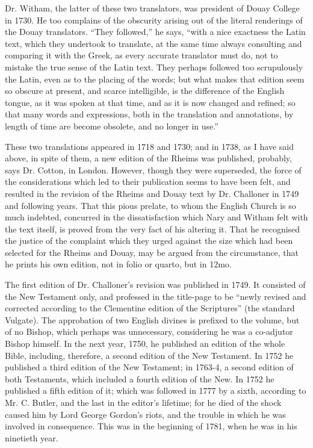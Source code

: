 Dr. Witham, the latter of these two translators, was president of
Douay College in 1730. He too complains of the obscurity arising out
of the literal renderings of the Douay translators. ``They
followed,'' he says, ``with a nice exactness the Latin text,
which they undertook to translate, at the same time always consulting
and comparing it with the Greek, as every accurate translator
must do, not to mistake the true sense of the Latin text. They perhaps
followed too scrupulously the Latin, even as to the placing of the
words; but what makes that edition seem so obscure at present, and
scarce intelligible, is the difference of the English tongue, as it
was spoken at that time, and as it is now changed and refined; so that
many words and expressions, both in the translation and annotations,
by length of time are become obsolete, and no longer in use.''

These two translations appeared in 1718 and 1730; and in 1738, as I
have said above, in spite of them, a new edition of the Rheims was
published, probably, says Dr. Cotton, in London. However, though they
were superseded, the force of the considerations which led to their
publication seems to have been felt, and resulted in the revision of
the Rheims and Douay text by Dr. Challoner in 1749 and following
years. That this pious prelate, to whom the English Church is so much
indebted, concurred in the dissatisfaction which Nary and Witham felt
with the text itself, is proved from the very fact of his altering it.
That he recognised the justice of the complaint which they urged
against the size which had been selected for the Rheims and Douay, may
be argued from the circumstance, that he prints his own edition, not
in folio or quarto, but in 12mo.

The first edition of Dr. Challoner's revision was published in
1749. It consisted of the New Testament only, and professed in the
title-page to be ``newly revised and corrected according to the
Clementine edition of the Scriptures'' (the standard
Vulgate). The approbation of two English divines is prefixed to the
volume, but of no Bishop, which perhaps was unnecessary, considering
he was a co-adjutor Bishop himself. In the next year, 1750, he
published an edition of the whole Bible, including, therefore, a
second edition of the New Testament. In 1752 he published a third
edition of the New Testament; in 1763-4, a second edition of both
Testaments, which included a fourth edition of the New. In 1752 he
published a fifth edition of it; which was followed in 1777 by a
sixth, according to Mr. C. Butler, and the last in the editor's
lifetime; for he died of the shock caused him by Lord George Gordon's
riots, and the trouble in which he was involved in consequence. This
was in the beginning of 1781, when he was in his ninetieth year.

